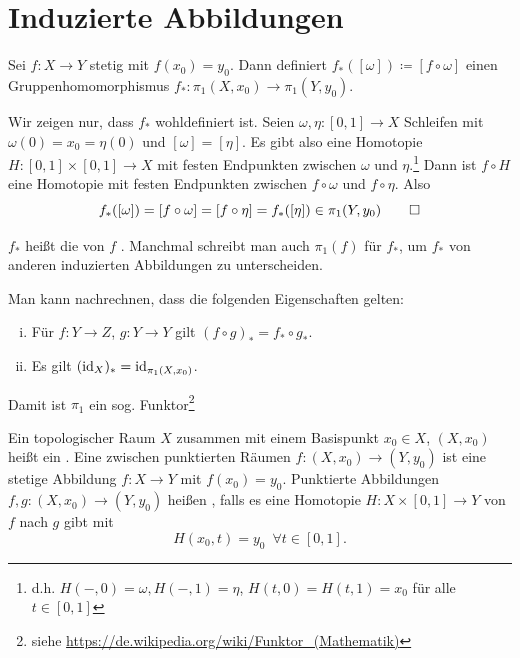 \newpage
\section{Induzierte Abbildungen} %
\label{sec:induzierte_abbildungen}
\begin{lemma}[{name=[induzierte Gruppenhomomorphismus der Fundamentalgruppen]}]
	Sei $f \colon X \to Y$ stetig mit $f(x_0)= y_0$. 
	Dann definiert $f_*([\omega]) \coloneqq [f \circ \omega]$ einen Gruppenhomomorphismus $f_* \colon \pi_1(X,x_0) \to \pi_1(Y,y_0)$.
\end{lemma}
\begin{beweis}
	Wir zeigen nur, dass $f_*$ wohldefiniert ist. 
	Seien $\omega, \eta \colon [0,1] \to X$ Schleifen mit $\omega(0)= x_0 = \eta(0)$ und $[\omega]= [\eta]$. 
	Es gibt also eine Homotopie $H \colon [0,1] \times [0,1] \to X$ mit festen Endpunkten zwischen $\omega$ und $\eta$.\footnote{d.h. $H(-,0)=\omega, H(-,1)=\eta$, $H(t,0)= H(t,1)= x_0$ für alle $t \in [0,1]$} 
	Dann ist $f \circ H$ eine Homotopie mit festen Endpunkten zwischen $f \circ \omega$ und $f \circ \eta$. 
	Also 
	\[
		f_*([\omega]) = \benbrace*{f \circ  \omega} = \benbrace*{f \circ \eta} = f_*([\eta]) \in \pi_1(Y,y_0)\qedhere
	\]
\end{beweis}

\begin{definition}[{name=[induzierte Abbildung]}]
	$f_*$ heißt die von $f$ . 
	Manchmal schreibt man auch $\pi_1(f)$ für $f_*$, um $f_*$ von anderen induzierten Abbildungen zu unterscheiden.
\end{definition}

Man kann nachrechnen, dass die folgenden Eigenschaften gelten:
\begin{enumerate}[(i)]
	\item Für $f \colon Y \to Z$, $g \colon Y \to Y$ gilt $(f \circ g)_* = f_* \circ  g_*$.
	\item Es gilt $(\id_X)_* = \id_{\pi_1(X,x_0)}$.
\end{enumerate}
Damit ist $\pi_1$ ein sog. Funktor\footnote{siehe \url{https://de.wikipedia.org/wiki/Funktor_(Mathematik)}}

\begin{definition}[{name=[{Punktierter Raum, punktierte Abbildung und punktiert homotop}]}]
	Ein topologischer Raum $X$ zusammen mit einem Basispunkt $x_0 \in X$, $(X,x_0)$ heißt ein . 
	Eine  zwischen punktierten Räumen $f \colon (X,x_0) \to (Y,y_0)$ ist eine stetige Abbildung $f \colon X \to Y$ mit $f(x_0)= y_0$. 
	Punktierte Abbildungen $f,g \colon (X,x_0) \to (Y,y_0)$ heißen , falls es eine Homotopie $H \colon X \times [0,1] \to Y$ von $f$ nach $g$ gibt mit 
	\[
		H(x_0,t)= y_0 \enspace \forall t \in [0,1].
	\]
\end{definition}

